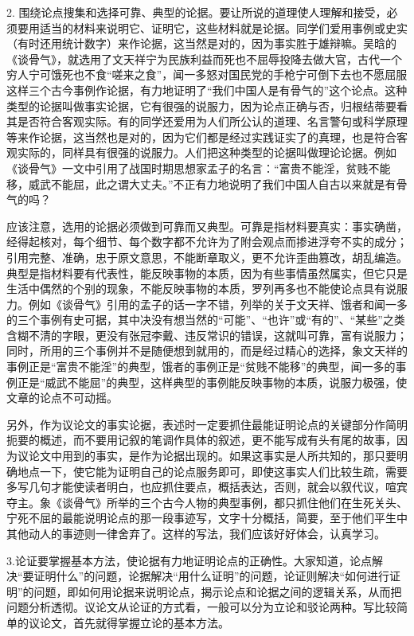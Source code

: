 2. 围绕论点搜集和选择可靠、典型的论据。要让所说的道理使人理解和接受，必须要用适当的材料来说明它、证明它，这些材料就是论据。同学们爱用事例或史实（有时还用统计数字）来作论据，这当然是对的，因为事实胜于雄辩嘛。吴晗的《谈骨气》，就选用了文天祥宁为民族利益而死也不屈辱投降去做大官，古代一个穷人宁可饿死也不食“嗟来之食”，闻一多怒对国民党的手枪宁可倒下去也不愿屈服这样三个古今事例作论据，有力地证明了“我们中国人是有骨气的”这个论点。这种类型的论据叫做事实论据，它有很强的说服力，因为论点正确与否，归根结蒂要看其是否符合客观实际。有的同学还爱用为人们所公认的道理、名言警句或科学原理等来作论据，这当然也是对的，因为它们都是经过实践证实了的真理，也是符合客观实际的，同样具有很强的说服力。人们把这种类型的论据叫做理论论据。例如《谈骨气》一文中引用了战国时期思想家孟子的名言：“富贵不能淫，贫贱不能移，威武不能屈，此之谓大丈夫。”不正有力地说明了我们中国人自古以来就是有骨气的吗？

应该注意，选用的论据必须做到可靠而又典型。可靠是指材料要真实：事实确凿，经得起核对，每个细节、每个数字都不允许为了附会观点而掺进浮夸不实的成分；引用完整、准确，忠于原文意思，不能断章取义，更不允许歪曲篡改，胡乱编造。典型是指材料要有代表性，能反映事物的本质，因为有些事情虽然属实，但它只是生活中偶然的个别的现象，不能反映事物的本质，罗列再多也不能使论点具有说服力。例如《谈骨气》引用的孟子的话一字不错，列举的关于文天祥、饿者和闻一多的三个事例有史可据，其中决没有想当然的“可能”、“也许”或“有的”、“某些”之类含糊不清的字眼，更没有张冠李戴、违反常识的错误，这就叫可靠，富有说服力；同时，所用的三个事例并不是随便想到就用的，而是经过精心的选择，象文天祥的事例正是“富贵不能淫”的典型，饿者的事例正是“贫贱不能移”的典型，闻一多的事例正是“威武不能屈”的典型，这样典型的事例能反映事物的本质，说服力极强，使文章的论点不可动摇。

另外，作为议论文的事实论据，表述时一定要抓住最能证明论点的关键部分作简明扼要的概述，而不要用记叙的笔调作具体的叙述，更不能写成有头有尾的故事，因为议论文中用到的事实，是作为论据出现的。如果这事实是人所共知的，那只要明确地点一下，使它能为证明自己的论点服务即可，即使这事实人们比较生疏，需要多写几句才能使读者明白，也应抓住要点，概括表达，否则，就会以叙代议，喧宾夺主。象《谈骨气》所举的三个古今人物的典型事例，都只抓住他们在生死关头、宁死不屈的最能说明论点的那一段事迹写，文字十分概括，简要，至于他们平生中其他动人的事迹则一律舍弃了。这样的写法，我们应该好好体会，认真学习。

3.论证要掌握基本方法，使论据有力地证明论点的正确性。大家知道，论点解决“要证明什么”的问题，论据解决“用什么证明”的问题，论证则解决“如何进行证明”的问题，即如何用论据来说明论点，揭示论点和论据之间的逻辑关系，从而把问题分析透彻。议论文从论证的方式看，一般可以分为立论和驳论两种。写比较简单的议论文，首先就得掌握立论的基本方法。

